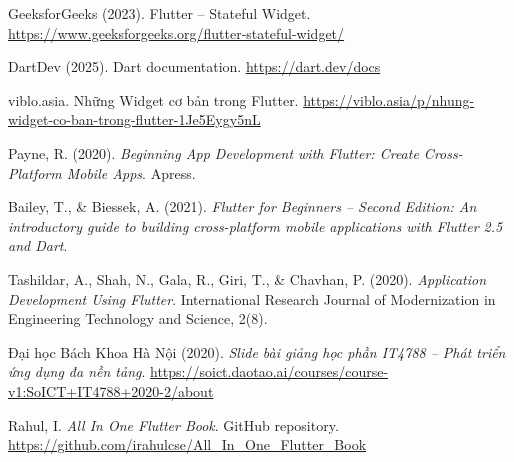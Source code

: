 \hypersetup{
  colorlinks=true,
  urlcolor=blue,
  linkcolor=black,
  citecolor=black
}

\begin{enumerate}[leftmargin=*, label={[\arabic*]}]
  \item GeeksforGeeks (2023). Flutter – Stateful Widget. \url{https://www.geeksforgeeks.org/flutter-stateful-widget/}
  \item DartDev (2025). Dart documentation. \url{https://dart.dev/docs}
  \item viblo.asia. Những Widget cơ bản trong Flutter. \url{https://viblo.asia/p/nhung-widget-co-ban-trong-flutter-1Je5Eygy5nL}
  \item Payne, R. (2020). \textit{Beginning App Development with Flutter: Create Cross-Platform Mobile Apps}. Apress.
  \item Bailey, T., \& Biessek, A. (2021). \textit{Flutter for Beginners – Second Edition: An introductory guide to building cross-platform mobile applications with Flutter 2.5 and Dart}.
  \item Tashildar, A., Shah, N., Gala, R., Giri, T., \& Chavhan, P. (2020). \textit{Application Development Using Flutter}. International Research Journal of Modernization in Engineering Technology and Science, 2(8). 
  \item Đại học Bách Khoa Hà Nội (2020). \textit{Slide bài giảng học phần IT4788 – Phát triển ứng dụng đa nền tảng}. \url{https://soict.daotao.ai/courses/course-v1:SoICT+IT4788+2020-2/about} 
  \item Rahul, I. \textit{All In One Flutter Book}. GitHub repository. \url{https://github.com/irahulcse/All_In_One_Flutter_Book}
\end{enumerate}
